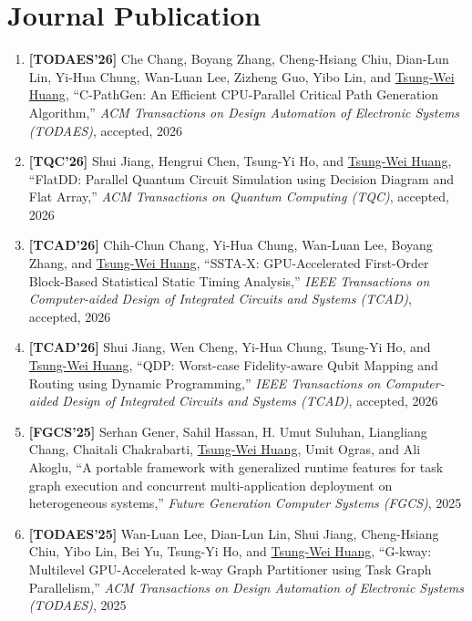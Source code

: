 \documentclass[A4,11pt]{article}
\begin{document}
\section{Journal Publication}
 \begin{enumerate}
 \itemsep-3pt
  
  \item \textbf{[TODAES'26]} Che Chang, Boyang Zhang, Cheng-Hsiang Chiu, Dian-Lun Lin, Yi-Hua Chung, Wan-Luan Lee, Zizheng Guo, Yibo Lin, and \underline{Tsung-Wei Huang}, ``C-PathGen: An Efficient CPU-Parallel Critical Path Generation Algorithm,'' \textit{ACM Transactions on Design Automation of Electronic Systems (TODAES)}, accepted, 2026
  
  \item \textbf{[TQC'26]} Shui Jiang, Hengrui Chen, Tsung-Yi Ho, and \underline{Tsung-Wei Huang}, ``FlatDD: Parallel Quantum Circuit Simulation using Decision Diagram and Flat Array,'' \textit{ACM Transactions on Quantum Computing (TQC)}, accepted, 2026
  
  \item \textbf{[TCAD'26]} Chih-Chun Chang, Yi-Hua Chung, Wan-Luan Lee, Boyang Zhang, and \underline{Tsung-Wei Huang}, ``SSTA-X: GPU-Accelerated First-Order Block-Based Statistical Static Timing Analysis,'' \textit{IEEE Transactions on Computer-aided Design of Integrated Circuits and Systems (TCAD)}, accepted, 2026
  
  \item \textbf{[TCAD'26]} Shui Jiang, Wen Cheng, Yi-Hua Chung, Tsung-Yi Ho, and \underline{Tsung-Wei Huang}, ``QDP: Worst-case Fidelity-aware Qubit Mapping and Routing using Dynamic Programming,'' \textit{IEEE Transactions on Computer-aided Design of Integrated Circuits and Systems (TCAD)}, accepted, 2026
 
 \item \textbf{[FGCS'25]} Serhan Gener, Sahil Hassan, H. Umut Suluhan, Liangliang Chang, Chaitali Chakrabarti, \underline{Tsung-Wei Huang}, Umit Ogras, and Ali Akoglu, ``A portable framework with generalized runtime features for task graph execution and concurrent multi-application deployment on heterogeneous systems,'' \textit{Future Generation Computer Systems (FGCS)}, 2025

 \item \textbf{[TODAES'25]}  Wan-Luan Lee, Dian-Lun Lin, Shui Jiang, Cheng-Hsiang Chiu, Yibo Lin, Bei Yu, Tsung-Yi Ho, and \underline{Tsung-Wei Huang}, ``G-kway: Multilevel GPU-Accelerated k-way Graph Partitioner using Task Graph Parallelism,'' \textit{ACM Transactions on Design Automation of Electronic Systems (TODAES)}, 2025


\end{enumerate}
\end{document}
